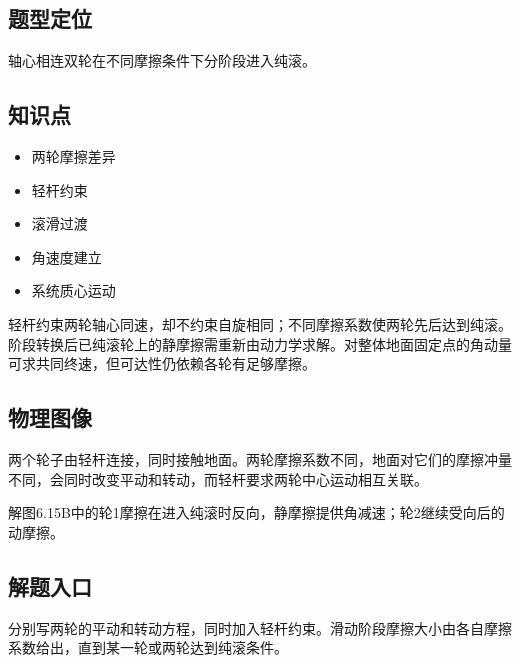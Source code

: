 \documentclass[UTF8,fontset=fandol,a4paper,11pt]{ctexart}
\providecommand{\tightlist}{\setlength{\itemsep}{0pt}\setlength{\parskip}{0pt}}
\begin{document}


\subsection*{题型定位}

轴心相连双轮在不同摩擦条件下分阶段进入纯滚。



\subsection*{知识点}

\begin{itemize}
\tightlist
\item
  两轮摩擦差异
\item
  轻杆约束
\item
  滚滑过渡
\item
  角速度建立
\item
  系统质心运动
\end{itemize}

轻杆约束两轮轴心同速，却不约束自旋相同；不同摩擦系数使两轮先后达到纯滚。阶段转换后已纯滚轮上的静摩擦需重新由动力学求解。对整体地面固定点的角动量可求共同终速，但可达性仍依赖各轮有足够摩擦。




\subsection*{物理图像}

两个轮子由轻杆连接，同时接触地面。两轮摩擦系数不同，地面对它们的摩擦冲量不同，会同时改变平动和转动，而轻杆要求两轮中心运动相互关联。

解图6.15B中的轮1摩擦在进入纯滚时反向，静摩擦提供角减速；轮2继续受向后的动摩擦。



\subsection*{解题入口}

分别写两轮的平动和转动方程，同时加入轻杆约束。滑动阶段摩擦大小由各自摩擦系数给出，直到某一轮或两轮达到纯滚条件。
\end{document}
